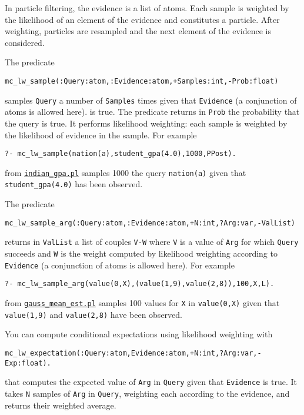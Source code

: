 In particle filtering, the evidence is a list of atoms. Each sample is weighted by the
likelihood of an element of the evidence and constitutes a particle.
After weighting, particles are resampled and the next element of the evidence
is considered.

 The predicate
\begin{verbatim}
mc_lw_sample(:Query:atom,:Evidence:atom,+Samples:int,-Prob:float)
\end{verbatim}
samples \verb|Query|  a number of \verb|Samples| times given that \verb|Evidence|
(a conjunction of atoms is allowed here). is true.
The predicate returns in \verb|Prob| the probability that the query is true.
It performs likelihood weighting: each sample is weighted by the
likelihood of evidence in the sample.
For example
\begin{verbatim}
?- mc_lw_sample(nation(a),student_gpa(4.0),1000,PPost).
\end{verbatim}
from \href{http://cplint.ml.unife.it/example/inference/indian_gpa.pl}{\texttt{indian\_gpa.pl}} samples 1000 the query
\verb|nation(a)| given that \verb|student_gpa(4.0)| has been observed.


 The predicate
\begin{verbatim}
mc_lw_sample_arg(:Query:atom,:Evidence:atom,+N:int,?Arg:var,-ValList)
\end{verbatim}
returns in \verb|ValList| a list of couples \verb|V-W| where \verb|V| is a value of \verb|Arg|
for which \verb|Query| succeeds and \verb|W| is the
weight computed by likelihood weighting
according to \verb|Evidence| (a conjunction of atoms is allowed here).
For example
\begin{verbatim}
?- mc_lw_sample_arg(value(0,X),(value(1,9),value(2,8)),100,X,L).
\end{verbatim}
from \href{http://cplint.ml.unife.it/example/inference/gauss_mean_est.pl}{\texttt{gauss\_mean\_est.pl}} samples 100 values for \verb|X| in
\verb|value(0,X)| given that \verb|value(1,9)| and \verb|value(2,8)| have been observed.

You can compute conditional expectations using likelihood weighting with
\begin{verbatim}
mc_lw_expectation(:Query:atom,Evidence:atom,+N:int,?Arg:var,-Exp:float).
\end{verbatim}
that computes the expected value of \verb|Arg| in \verb|Query| given that
\verb|Evidence| is true.
It takes \verb|N| samples of  \verb|Arg| in \verb|Query|, weighting each according
to the evidence, and returns their weighted average.



